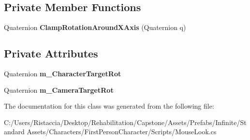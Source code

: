 \subsection*{Private Member Functions}
\begin{DoxyCompactItemize}
\item 
\mbox{\label{class_unity_standard_assets_1_1_characters_1_1_first_person_1_1_mouse_look_a53af75fd91117e7f2d45974298bb9efa}} 
Quaternion {\bfseries Clamp\+Rotation\+Around\+X\+Axis} (Quaternion q)
\end{DoxyCompactItemize}
\subsection*{Private Attributes}
\begin{DoxyCompactItemize}
\item 
\mbox{\label{class_unity_standard_assets_1_1_characters_1_1_first_person_1_1_mouse_look_a1a0a95f17d27ceebb24c1b88c7db5730}} 
Quaternion {\bfseries m\+\_\+\+Character\+Target\+Rot}
\item 
\mbox{\label{class_unity_standard_assets_1_1_characters_1_1_first_person_1_1_mouse_look_ae3cbf279fbf589ea91aee01db7a13925}} 
Quaternion {\bfseries m\+\_\+\+Camera\+Target\+Rot}
\end{DoxyCompactItemize}


The documentation for this class was generated from the following file\+:\begin{DoxyCompactItemize}
\item 
C\+:/\+Users/\+Ristaccia/\+Desktop/\+Rehabilitation/\+Capstone/\+Assets/\+Prefabs/\+Infinite/\+Standard Assets/\+Characters/\+First\+Person\+Character/\+Scripts/Mouse\+Look.\+cs\end{DoxyCompactItemize}

